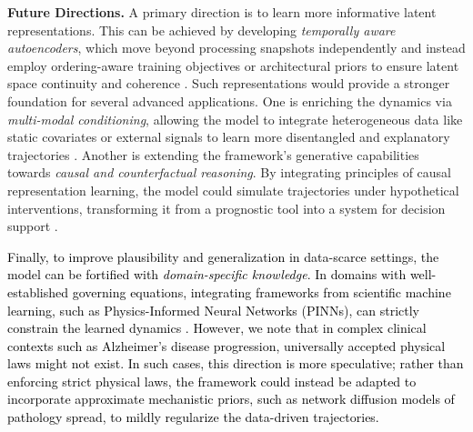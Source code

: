 \documentclass[twoside]{article}
\begin{document}
\textbf{Future Directions.} A primary direction is to learn more informative latent representations. This can be achieved by developing \emph{temporally aware autoencoders}, which move beyond processing snapshots independently and instead employ ordering-aware training objectives or architectural priors to ensure latent space continuity and coherence \citep{yang2023self, blattmann2023align}. Such representations would provide a stronger foundation for several advanced applications. One is enriching the dynamics via \emph{multi-modal conditioning}, allowing the model to integrate heterogeneous data like static covariates or external signals to learn more disentangled and explanatory trajectories \citep{shaik2024survey, wu2024q}. Another is extending the framework's generative capabilities towards \emph{causal and counterfactual reasoning}. By integrating principles of causal representation learning, the model could simulate trajectories under hypothetical interventions, transforming it from a prognostic tool into a system for decision support \citep{von2024causal}.


\textcolor{black}{Finally, to improve plausibility and generalization in data-scarce settings, the model can be fortified with \emph{domain-specific knowledge}. In domains with well-established governing equations, integrating frameworks from scientific machine learning, such as Physics-Informed Neural Networks (PINNs), can strictly constrain the learned dynamics \citep{qian2025physics, cuomo2023scientific}. However, we note that in complex clinical contexts such as Alzheimer's disease progression, universally accepted physical laws might not exist. In such cases, this direction is more speculative; rather than enforcing strict physical laws, the framework could instead be adapted to incorporate approximate mechanistic priors, such as network diffusion models of pathology spread, to mildly regularize the data-driven trajectories.}
\end{document}
